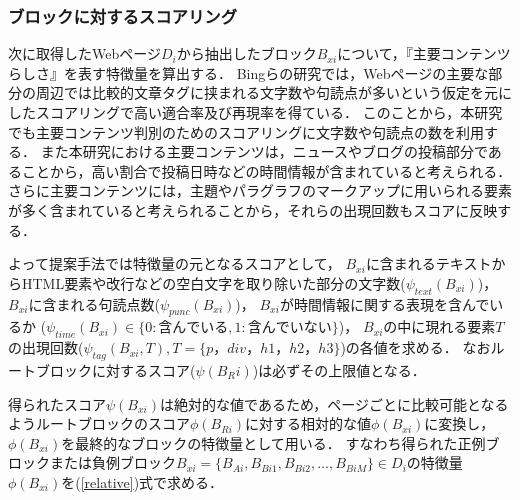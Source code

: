 \documentclass[a4paper,10pt,twocolumn]{jsarticle}
\begin{document}
\subsubsection{ブロックに対するスコアリング}\label{scoring}

次に取得したWebページ$D_i$から抽出したブロック$B_{xi}$について，『主要コンテンツらしさ』を表す特徴量を算出する．
Bing\cite{lbing}らの研究では，Webページの主要な部分の周辺では比較的文章タグに挟まれる文字数や句読点が多いという仮定を元にしたスコアリングで高い適合率及び再現率を得ている．
このことから，本研究でも主要コンテンツ判別のためのスコアリングに文字数や句読点の数を利用する．
また本研究における主要コンテンツは，ニュースやブログの投稿部分であることから，高い割合で投稿日時などの時間情報が含まれていると考えられる．
さらに主要コンテンツには，主題やパラグラフのマークアップに用いられる要素が多く含まれていると考えられることから，それらの出現回数もスコアに反映する．

よって提案手法では特徴量の元となるスコアとして，
$B_{xi}$に含まれるテキストからHTML要素や改行などの空白文字を取り除いた部分の文字数($\psi_{text}(B_{xi})$)，
$B_{xi}$に含まれる句読点数($\psi_{punc}(B_{xi})$)，
$B_{xi}$が時間情報に関する表現を含んでいるか ($\psi_{time}(B_{xi}) \in \{0: 含んでいる, 1: 含んでいない\}$)，
$B_{xi}$の中に現れる要素$T$の出現回数($\psi_{tag}(B_{xi},T), T=\{p，div，h1，h2，h3\}$)の各値を求める．
なおルートブロックに対するスコア($\psi(B_Ri)$)は必ずその上限値となる．

得られたスコア$\psi(B_{xi})$は絶対的な値であるため，ページごとに比較可能となるようルートブロックのスコア$\phi(B_{Ri})$に対する相対的な値$\phi(B_{xi})$に変換し，$\phi(B_{xi})$を最終的なブロックの特徴量として用いる．
すなわち得られた正例ブロックまたは負例ブロック$B_{xi} = \{B_{Ai}, B_{Bi1}, B_{Bi2}, \dots , B_{BiM}\} \in D_i$の特徴量$\phi(B_{xi})$を(\ref{relative})式で求める．
\end{document}
